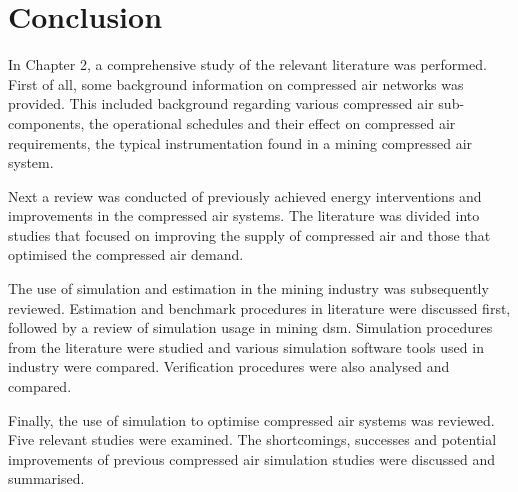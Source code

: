\section{Conclusion}
In Chapter 2, a comprehensive study of the relevant literature was performed. First of all, some background information on compressed air networks was provided. This included background regarding various compressed air sub-components, the operational schedules and their effect on compressed air requirements, the typical instrumentation found in a mining compressed air system.
\clearpage
\par
Next a review was conducted of previously achieved energy interventions and improvements in the compressed air systems. The literature was divided into studies that focused on improving the supply of compressed air and those that optimised the compressed air demand.
\par
The use of simulation and estimation in the mining industry was subsequently reviewed. Estimation and benchmark procedures in literature were discussed first, followed by a review of simulation usage in mining \gls{dsm}. Simulation procedures from the literature were studied and various simulation software tools used in industry were compared. Verification procedures were also analysed and compared.
\par 
	Finally, the use of simulation to optimise compressed air systems was reviewed.  Five relevant studies were examined. The shortcomings, successes and potential improvements of previous compressed air simulation studies were discussed and summarised.